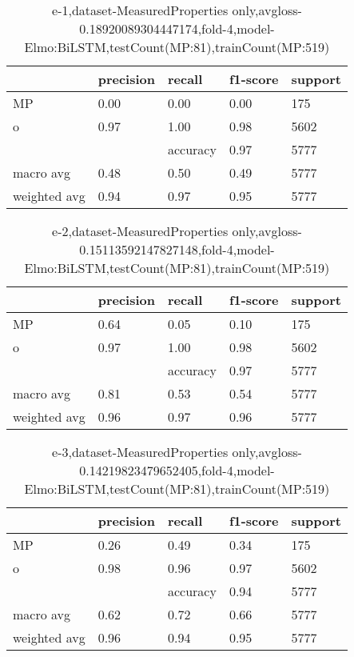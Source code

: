 \begin{table}[!ht] 
\centering
\caption{e-1,dataset-MeasuredProperties only,avgloss-0.18920089304447174,fold-4,model-Elmo:BiLSTM,testCount(MP:81),trainCount(MP:519)}\label{e-1data-mpS.tsv}
\begin{tabularx}{300pt}{|X|X|X|X|X|}
\hline
&precision&recall&f1-score&support\\
\hline
MP&0.00&0.00&0.00&175\\
\hline
o&0.97&1.00&0.98&5602\\
\hline
&&accuracy&0.97&5777\\
\hline
macro avg&0.48&0.50&0.49&5777\\
\hline
weighted avg&0.94&0.97&0.95&5777\\
\hline
\end{tabularx}
\end{table}
\begin{table}[!ht] 
\centering
\caption{e-2,dataset-MeasuredProperties only,avgloss-0.15113592147827148,fold-4,model-Elmo:BiLSTM,testCount(MP:81),trainCount(MP:519)}\label{e-2data-mpS.tsv}
\begin{tabularx}{300pt}{|X|X|X|X|X|}
\hline
&precision&recall&f1-score&support\\
\hline
MP&0.64&0.05&0.10&175\\
\hline
o&0.97&1.00&0.98&5602\\
\hline
&&accuracy&0.97&5777\\
\hline
macro avg&0.81&0.53&0.54&5777\\
\hline
weighted avg&0.96&0.97&0.96&5777\\
\hline
\end{tabularx}
\end{table}
\begin{table}[!ht] 
\centering
\caption{e-3,dataset-MeasuredProperties only,avgloss-0.14219823479652405,fold-4,model-Elmo:BiLSTM,testCount(MP:81),trainCount(MP:519)}\label{e-3data-mpS.tsv}
\begin{tabularx}{300pt}{|X|X|X|X|X|}
\hline
&precision&recall&f1-score&support\\
\hline
MP&0.26&0.49&0.34&175\\
\hline
o&0.98&0.96&0.97&5602\\
\hline
&&accuracy&0.94&5777\\
\hline
macro avg&0.62&0.72&0.66&5777\\
\hline
weighted avg&0.96&0.94&0.95&5777\\
\hline
\end{tabularx}
\end{table}
